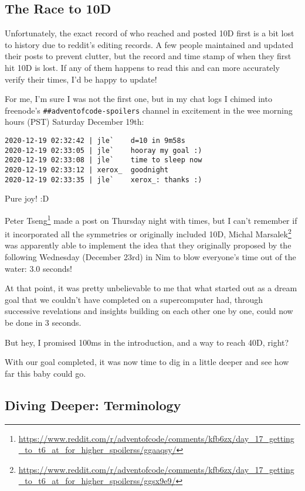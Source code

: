 \documentclass[]{article}
\renewcommand{\href}[2]{#2\footnote{\url{#1}}}
\begin{document}
\hypertarget{the-race-to-10d}{%
\subsection{The Race to 10D}\label{the-race-to-10d}}

Unfortunately, the exact record of who reached and posted 10D first is a bit
lost to history due to reddit's editing records. A few people maintained and
updated their posts to prevent clutter, but the record and time stamp of when
they first hit 10D is lost. If any of them happens to read this and can more
accurately verify their times, I'd be happy to update!

For me, I'm sure I was not the first one, but in my chat logs I chimed into
freenode's \texttt{\#\#adventofcode-spoilers} channel in excitement in the wee
morning hours (PST) Saturday December 19th:

\begin{verbatim}
2020-12-19 02:32:42 | jle`    d=10 in 9m58s
2020-12-19 02:33:05 | jle`    hooray my goal :)
2020-12-19 02:33:08 | jle`    time to sleep now
2020-12-19 02:33:12 | xerox_  goodnight
2020-12-19 02:33:35 | jle`    xerox_: thanks :)
\end{verbatim}

Pure joy! :D

\href{https://www.reddit.com/r/adventofcode/comments/kfb6zx/day_17_getting_to_t6_at_for_higher_spoilerss/ggaaqsy/}{Peter
Tseng} made a post on Thursday night with times, but I can't remember if it
incorporated all the symmetries or originally included 10D,
\href{https://www.reddit.com/r/adventofcode/comments/kfb6zx/day_17_getting_to_t6_at_for_higher_spoilerss/ggsx9e9/}{Michal
Marsalek} was apparently able to implement the idea that they originally
proposed by the following Wednesday (December 23rd) in Nim to blow everyone's
time out of the water: 3.0 seconds!

At that point, it was pretty unbelievable to me that what started out as a dream
goal that we couldn't have completed on a supercomputer had, through successive
revelations and insights building on each other one by one, could now be done in
3 seconds.

But hey, I promised 100ms in the introduction, and a way to reach 40D, right?

With our goal completed, it was now time to dig in a little deeper and see how
far this baby could go.

\hypertarget{diving-deeper-terminology}{%
\subsection{Diving Deeper: Terminology}\label{diving-deeper-terminology}}
\end{document}
